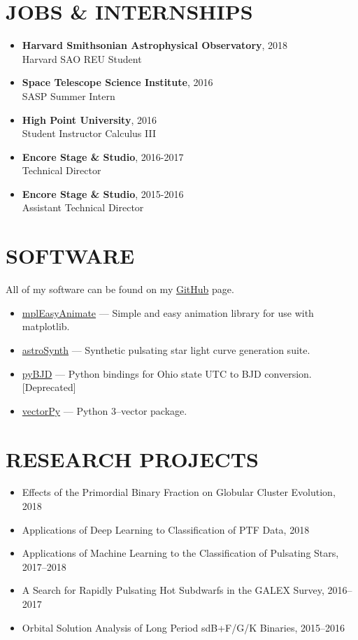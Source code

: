 \documentclass[margin, 10pt]{res} %
\begin{document}
\begin{resume}
\section{JOBS \& INTERNSHIPS}
\begin{itemize}
  \item \textbf{{\scriptsize Harvard Smithsonian Astrophysical Observatory}}, {\small 2018} \\Harvard SAO REU Student
  \item \textbf{{\scriptsize Space Telescope Science Institute}}, {\small 2016} \\SASP Summer Intern
  \item \textbf{{\scriptsize High Point University}}, {\small 2016}\\Student Instructor Calculus III
  \item \textbf{{\scriptsize Encore Stage \& Studio}}, {\small 2016-2017}\\Technical Director
  \item \textbf{{\scriptsize Encore Stage \& Studio}}, {\small2015-2016}\\Assistant Technical Director
\end{itemize}

\section{SOFTWARE}
All of my software can be found on my \href{https://github.com/tboudreaux}{GitHub} page.
\begin{itemize}
\item \href{https://github.com/tboudreaux/mpl_animate}{mplEasyAnimate} --- Simple and easy animation library for use with matplotlib.
\item \href{https://github.com/AstroSynth/astroSynth}{astroSynth} --- Synthetic pulsating star light curve generation suite.
\item \href{https://github.com/tboudreaux/pyBJD}{pyBJD} --- Python bindings for Ohio state UTC to BJD conversion. [Deprecated]
\item \href{https://github.com/tboudreaux/vectorpy}{vectorPy} --- Python 3--vector package.
\end{itemize}

\section{RESEARCH PROJECTS}
\begin{itemize}
    \item Effects of the Primordial Binary Fraction on Globular Cluster Evolution, 2018
	\item Applications of Deep Learning to Classification of PTF Data, 2018
    \item Applications of Machine Learning to the Classification of Pulsating Stars, 2017--2018
    \item A Search for Rapidly Pulsating Hot Subdwarfs in the GALEX Survey, 2016--2017
    \item Orbital Solution Analysis of Long Period sdB+F/G/K Binaries, 2015--2016
\end{itemize}


\end{resume}
\end{document}
